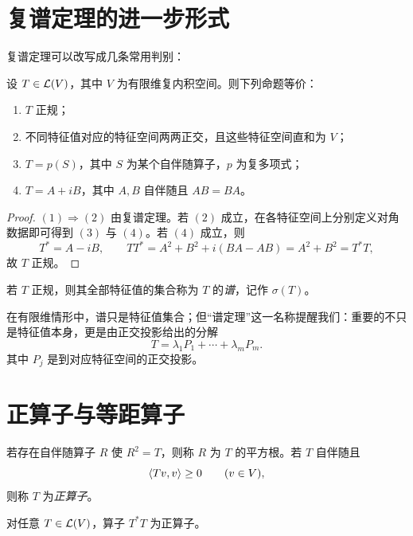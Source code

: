 \section{复谱定理的进一步形式}

复谱定理可以改写成几条常用判别：

\begin{proposition}
设 $T\in\mathcal{L}(V)$，其中 $V$ 为有限维复内积空间。则下列命题等价：
\begin{enumerate}[label=(\arabic*)]
\item $T$ 正规；
\item 不同特征值对应的特征空间两两正交，且这些特征空间直和为 $V$；
\item $T=p(S)$，其中 $S$ 为某个自伴随算子，$p$ 为复多项式；
\item $T=A+iB$，其中 $A,B$ 自伴随且 $AB=BA$。
\end{enumerate}
\end{proposition}

\begin{proof}
$(1)\Rightarrow(2)$ 由复谱定理。若 $(2)$ 成立，在各特征空间上分别定义对角数据即可得到 $(3)$ 与 $(4)$。若 $(4)$ 成立，则
\[
T^*=A-iB,
\qquad
TT^*=A^2+B^2+i(BA-AB)=A^2+B^2=T^*T,
\]
故 $T$ 正规。
\end{proof}

\begin{definition}
若 $T$ 正规，则其全部特征值的集合称为 $T$ 的\emph{谱}，记作 $\sigma(T)$。
\end{definition}

\begin{remark}
在有限维情形中，谱只是特征值集合；但“谱定理”这一名称提醒我们：重要的不只是特征值本身，更是由正交投影给出的分解
\[
T=\lambda_1P_1+\cdots+\lambda_mP_m.
\]
其中 $P_j$ 是到对应特征空间的正交投影。
\end{remark}

\section{正算子与等距算子}

\begin{definition}
若存在自伴随算子 $R$ 使 $R^2=T$，则称 $R$ 为 $T$ 的平方根。若 $T$ 自伴随且
\[
\langle Tv, v \rangle\ge 0\qquad(v\in V),
\]
则称 $T$ 为\emph{正算子}。
\end{definition}

\begin{proposition}
对任意 $T\in\mathcal{L}(V)$，算子 $T^*T$ 为正算子。
\end{proposition}

